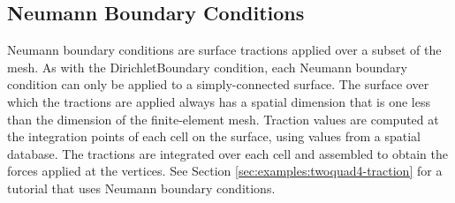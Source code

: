 \subsection{Neumann Boundary Conditions}

Neumann boundary conditions are surface tractions applied over a subset
of the mesh. As with the DirichletBoundary condition, each Neumann
boundary condition can only be applied to a simply-connected surface.
The surface over which the tractions are applied always has a spatial
dimension that is one less than the dimension of the finite-element
mesh. Traction values are computed at the integration points of each
cell on the surface, using values from a spatial database. The tractions
are integrated over each cell and assembled to obtain the forces applied
at the vertices. See Section \vref{sec:examples:twoquad4-traction}
for a tutorial that uses Neumann boundary conditions.


